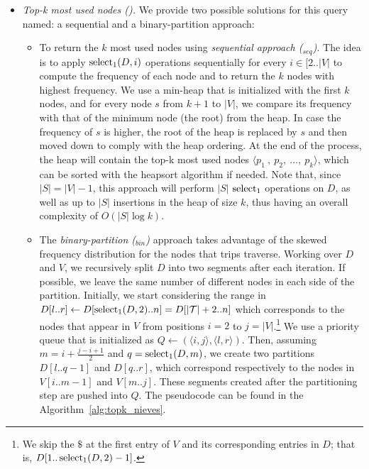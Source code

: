\begin{itemize}
	\item {\em Top-k most used nodes (\topK).}
	We provide two possible solutions for this query named: a sequential and a binary-partition approach:

	\begin{itemize}
	\item To return the $k$ most used nodes using {\em sequential approach (\topK$_{seq}$)}. The idea is
	to apply  $\operatorname{select}_1(D,i)$ operations sequentially for every $i \in [2..|V|$ to compute the 
	frequency of each node and to return the $k$ nodes with highest frequency.
	We use a min-heap that is initialized with
	the first $k$ nodes, and for every node $s$ from $k+1$ to $|V|$, 
	we compare its frequency with that of the minimum node (the root) from
	the heap. In case the frequency of $s$ is higher, the root of the heap is replaced by $s$ and
	then moved down to comply with the heap ordering. At the end of the process, the heap
	will contain the top-k most used nodes $\langle p_1\:,\:p_2,\:\dots,\:p_k \rangle$, which can be 
	sorted with the heapsort algorithm if needed. 
	Note that, since $|S| = |V|-1$, this approach will perform $|S|$ $\operatorname{select}_1$ operations on $D$, as well as up to $|S|$ insertions in the heap of size $k$, thus having an overall complexity of $O(|S|\log k)$.

	\item The {\em binary-partition (\topK$_{bin}$)} approach takes advantage of the skewed 
	frequency distribution for the nodes that trips traverse.  Working over $D$ and $V$, we 
	recursively split $D$  into two segments after each iteration. 
	If possible, we leave the same number of different nodes in each side of the partition. 
	Initially, we start considering the range in $D[l..r] \leftarrow D[\operatorname{select}_1(D,2)..n]=D[|\mathcal{T}|+2..n]$ 
	which corresponds to the nodes that appear in 
	$V$ from positions $i=2$ to $j=|V|$.\footnote{We skip the $\$$ at the first entry of $V$ and its corresponding 
	entries in $D$; that is, $D[1..\operatorname{select}_1(D,2)-1]$.}
	We use a priority queue that is initialized as $Q \leftarrow (\langle i,j\rangle, \langle l,r\rangle)$.
	Then, assuming $m=i + \frac{j-i+1}{2}$ and $q=\operatorname{select}_1(D,m)$, we create two partitions 
	$D[l..q-1]$ and  $D[q..r]$, which correspond respectively to the nodes in $V[i..m-1]$ and $V[m..j]$.
	These  segments created after the partitioning step are
	pushed into  $Q$. %
	The pseudocode can be found in the Algorithm~\ref{alg:topk_nieves}.


\end{itemize}
\end{itemize}
